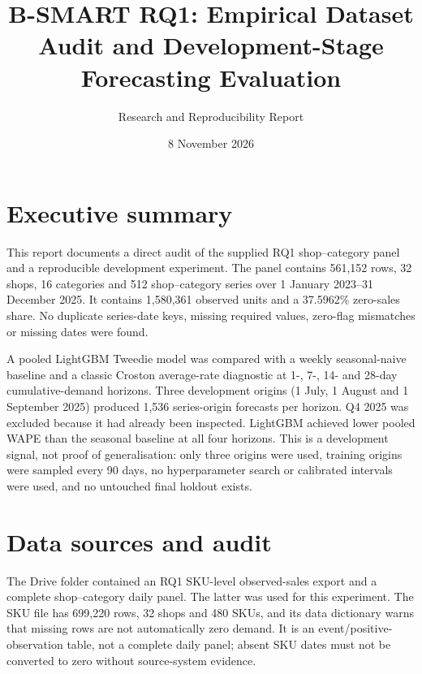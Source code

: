 \documentclass[11pt,a4paper]{article}
\title{B-SMART RQ1: Empirical Dataset Audit and Development-Stage Forecasting Evaluation}
\author{Research and Reproducibility Report}
\date{8 November 2026}
\begin{document}
\maketitle
\begin{center}\end{center}
\tableofcontents\newpage
\section{Executive summary}
This report documents a direct audit of the supplied RQ1 shop--category panel and a reproducible development experiment. The panel contains 561,152 rows, 32 shops, 16 categories and 512 shop--category series over 1 January 2023--31 December 2025. It contains 1,580,361 observed units and a 37.5962\% zero-sales share. No duplicate series-date keys, missing required values, zero-flag mismatches or missing dates were found.

A pooled LightGBM Tweedie model was compared with a weekly seasonal-naive baseline and a classic Croston average-rate diagnostic at 1-, 7-, 14- and 28-day cumulative-demand horizons. Three development origins (1 July, 1 August and 1 September 2025) produced 1,536 series-origin forecasts per horizon. Q4 2025 was excluded because it had already been inspected. LightGBM achieved lower pooled WAPE than the seasonal baseline at all four horizons. This is a development signal, not proof of generalisation: only three origins were used, training origins were sampled every 90 days, no hyperparameter search or calibrated intervals were used, and no untouched final holdout exists.

\section{Data sources and audit}
The Drive folder contained an RQ1 SKU-level observed-sales export and a complete shop--category daily panel. The latter was used for this experiment. The SKU file has 699,220 rows, 32 shops and 480 SKUs, and its data dictionary warns that missing rows are not automatically zero demand. It is an event/positive-observation table, not a complete daily panel; absent SKU dates must not be converted to zero without source-system evidence.
\end{document}
